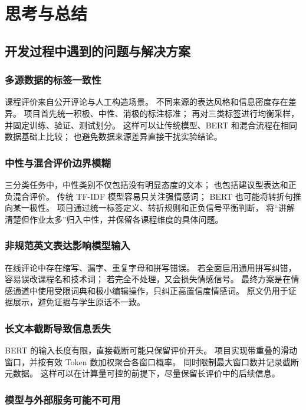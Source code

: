 \section{思考与总结}

\subsection{开发过程中遇到的问题与解决方案}

\subsubsection{多源数据的标签一致性}

课程评价来自公开评论与人工构造场景。
不同来源的表达风格和信息密度存在差异。
项目首先统一积极、中性、消极的标注标准；
再对三类标签进行均衡采样，并固定训练、验证、测试划分。
这样可以让传统模型、BERT 和混合流程在相同数据基础上比较；
也避免数据来源差异直接干扰实验结论。

\subsubsection{中性与混合评价边界模糊}

三分类任务中，中性类别不仅包括没有明显态度的文本；
也包括建议型表达和正负混合评价。
传统 TF-IDF 模型容易只关注强情感词；
BERT 也可能将转折句推向某一极性。
项目通过统一标签定义、转折规则和正负信号平衡判断，
将“讲解清楚但作业太多”归入中性，并保留各课程维度的具体问题。

\subsubsection{非规范英文表达影响模型输入}

在线评论中存在缩写、漏字、重复字母和拼写错误。
若全面启用通用拼写纠错，容易误改课程名和技术词；
若完全不处理，又会损失情感信号。
最终方案是在情感通道中使用受限词典和极小编辑操作，只纠正高置信度情感词。
原文仍用于证据展示，避免证据与学生原话不一致。

\subsubsection{长文本截断导致信息丢失}

BERT 的输入长度有限，直接截断可能只保留评价开头。
项目实现带重叠的滑动窗口，并按有效 Token 数加权聚合各窗口概率。
同时限制最大窗口数并记录截断元数据。
这样可以在计算量可控的前提下，尽量保留长评价中的后续信息。

\subsubsection{模型与外部服务可能不可用}

